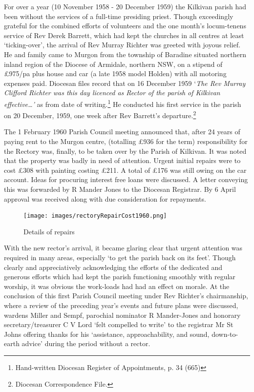 For over a year (10 November 1958 - 20 December 1959) the Kilkivan
parish had been without the services of a full-time presiding priest.
Though exceedingly grateful for the combined efforts of volunteers and
the one month's locum-tenens service of Rev Derek Barrett, which had
kept the churches in all centres at least `ticking-over', the arrival of
Rev Murray Richter was greeted with joyous relief. He and family came to
Murgon from the township of Baradine situated northern inland region of
the Diocese of Armidale, northern NSW, on a stipend of \pounds975/pa plus
house and car (a late 1958 model Holden) with all motoring expenses
paid. Diocesan files record that on 16 December 1959 `\emph{The Rev
Murray Clifford Richter was this day licenced as Rector of the parish of
Kilkivan effective\ldots'} as from date of writing.\footnote{Hand-written
  Diocesan Register of Appointments, p. 34 (665)} He conducted his first
service in the parish on 20 December, 1959, one week after Rev Barrett's
departure.\footnote{Diocesan Correspondence File.}

The 1 February 1960 Parish Council meeting announced that, after 24
years of paying rent to the Murgon centre, (totalling \pounds936 for the term)
responsibility for the Rectory was, finally, to be taken over by the
Parish of Kilkivan. It was noted that the property was badly in need of
attention. Urgent initial repairs were to cost \pounds308 with painting
costing \pounds211. A total of \pounds176 was still owing on the car account. Ideas
for procuring interest free loans were discussed. A letter conveying
this was forwarded by R Mander Jones to the Diocesan Registrar. By 6
April approval was received along with due consideration for repayments.




\begin{figure}
\begin{center}
\texttt{[image: images/rectoryRepairCost1960.png]}
\caption{Details of repairs}
\end{center}
\end{figure}


With the new rector's arrival, it became glaring clear that urgent
attention was required in many areas, especially `to get the parish back
on its feet'. Though clearly and appreciatively acknowledging the
efforts of the dedicated and generous efforts which had kept the parish
functioning smoothly with regular worship, it was obvious the work-loads
had had an effect on morale. At the conclusion of this first Parish
Council meeting under Rev Richter's chairmanship, where a review of the
preceding year's events and future plans were discussed, wardens Miller
and Sempf, parochial nominator R Mander-Jones and honorary
secretary/treasurer C V Lord `felt compelled to write' to the registrar
Mr St Johns offering thanks for his `assistance, approachability, and
sound, down-to-earth advice' during the period without a rector.

